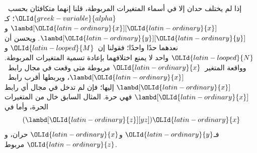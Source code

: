 \documentclass[../../../include/open-logic-section]{subfiles}
\begin{document}
إذا لم يختلف حدان إلا في أسماء المتغيرات المربوطة، قلنا إنهما
متكافئان بحسب~$\OLId{greek-variable}{alpha}$؛ كـ$\lambd[\OLId{latin-ordinary}{x}][\OLId{latin-ordinary}{x}]$ و$\lambd[\OLId{latin-ordinary}{y}][\OLId{latin-ordinary}{y}]$.
ويحسن أن نعدهما حدًا واحدًا؛ فقولنا إن~$\OLId{latin-looped}{M}$ و$\OLId{latin-looped}{N}$ واحد
لا يمنع اختلافهما بإعادة تسمية المتغيرات المربوطة.
وواقعة المتغير~$\OLId{latin-ordinary}{x}$ مربوطة متى وقعت في مجال رابط~$\lambd[\OLId{latin-ordinary}{x}]$،
ويربطها أقرب رابط~$\lambd[\OLId{latin-ordinary}{x}]$ إليها؛ فإن لم تدخل في مجال أي رابط
$\lambd[\OLId{latin-ordinary}{x}]$ فهي حرة. المثال السابق خال من المتغيرات الحرة،
وأما في
\[
(\lambd[\OLId{latin-ordinary}{z}][yz])\OLId{latin-ordinary}{x}
\]
فـ$\OLId{latin-ordinary}{y}$ و$\OLId{latin-ordinary}{x}$ حران، و$\OLId{latin-ordinary}{z}$ مربوط.
\end{document}
